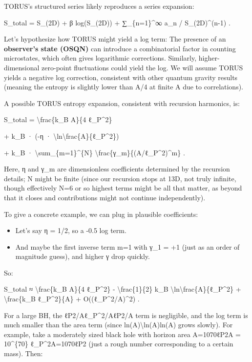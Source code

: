 \documentclass[]{article}
\begin{document}
TORUS's structured series likely reproduces a series expansion:

S\_total = S\_(2D) + β log(S\_(2D)) + ∑\_\{n=1\}\^{}∞ a\_n /
S\_(2D)\^{}(n-1) .

Let's hypothesize how TORUS might yield a log term: The presence of an
\textbf{observer's state (OSQN)} can introduce a combinatorial factor in
counting microstates, which often gives logarithmic corrections.
Similarly, higher-dimensional zero-point fluctuations could yield the
log. We will assume TORUS yields a negative log correction, consistent
with other quantum gravity results (meaning the entropy is slightly
lower than A/4 at finite A due to correlations).

A possible TORUS entropy expansion, consistent with recursion harmonics,
is:

S\_total = \textbackslash{}frac\{k\_B A\}\{4 ℓ\_P\^{}2\}

+ k\_B · (-η · \textbackslash{}ln\textbackslash{}frac\{A\}\{ℓ\_P\^{}2\})

+ k\_B · \textbackslash{}sum\_\{m=1\}\^{}\{N\}
\textbackslash{}frac\{γ\_m\}\{(A/ℓ\_P\^{}2)\^{}m\} .

Here, η and γ\_m are dimensionless coefficients determined by the
recursion details; N might be finite (since our recursion stops at 13D,
not truly infinite, though effectively N=6 or so highest terms might be
all that matter, as beyond that it closes and contributions might not
continue independently).

To give a concrete example, we can plug in plausible coefficients:

\begin{itemize}
\item
  Let's say η = 1/2, so a -0.5 log term.
\item
  And maybe the first inverse term m=1 with γ\_1 = +1 (just as an order
  of magnitude guess), and higher γ drop quickly.
\end{itemize}

So:

S\_total ≈ \textbackslash{}frac\{k\_B A\}\{4 ℓ\_P\^{}2\} -
\textbackslash{}frac\{1\}\{2\} k\_B
\textbackslash{}ln\textbackslash{}frac\{A\}\{ℓ\_P\^{}2\} +
\textbackslash{}frac\{k\_B ℓ\_P\^{}2\}\{A\} + O((ℓ\_P\^{}2/A)\^{}2) .

For a large BH, the ℓP2/Aℓ\_P\^{}2/AℓP2​/A term is negligible, and the
log term is much smaller than the area term (since
ln⁡(A)\textbackslash{}ln(A)ln(A) grows slowly). For example, take a
moderately sized black hole with horizon area A=1070ℓP2A = 10\^{}\{70\}
ℓ\_P\^{}2A=1070ℓP2​ (just a rough number corresponding to a certain
mass). Then:
\end{document}
